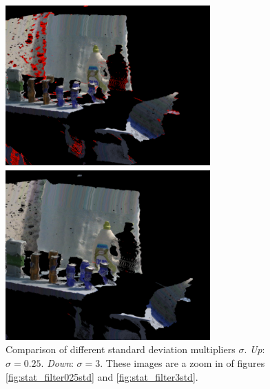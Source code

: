 \documentclass[../main.tex]{subfiles}
\begin{document}
\begin{figure}[htbp]
    \centering
    \includegraphics[width=0.7\textwidth]{images/stat_filtered_compareStds.png}
    \caption{Comparison of different standard deviation multipliers $\sigma$. \emph{Up}: $\sigma=0.25$. \emph{Down}: $\sigma=3$. These images are a zoom in of figures \ref{fig:stat_filter025std} and \ref{fig:stat_filter3std}.}
    \label{fig:stat_filtered_compareStds}
\end{figure}
\end{document}
